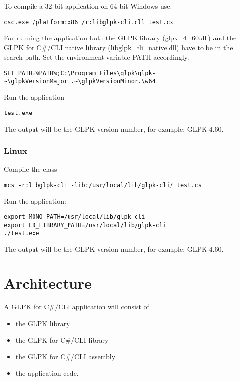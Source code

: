 \documentclass[a4paper,11pt]{report}
\newcommand{\glpkVersionMajor}{4}
\newcommand{\glpkVersionMinor}{60}
\begin{document}
To compile a 32 bit application on 64 bit Windows use:

\begin{lstlisting}
csc.exe /platform:x86 /r:libglpk-cli.dll test.cs
\end{lstlisting}

For running the application both the GLPK library
(glpk\_\glpkVersionMajor\_\glpkVersionMinor.dll) and the GLPK for C\#/CLI
native library (libglpk\_cli\_native.dll) have to be in the search path.
Set the environment variable PATH accordingly.

\begin{lstlisting}
SET PATH=%PATH%;C:\Program Files\glpk\glpk-~\glpkVersionMajor..~\glpkVersionMinor.\w64
\end{lstlisting}

Run the application

\begin{lstlisting}
test.exe
\end{lstlisting}

The output will be the GLPK version number, for example:
GLPK \glpkVersionMajor.\glpkVersionMinor.

\subsection{Linux}
Compile the class

\begin{lstlisting}
mcs -r:libglpk-cli -lib:/usr/local/lib/glpk-cli/ test.cs
\end{lstlisting}

Run the application:

\begin{lstlisting}
export MONO_PATH=/usr/local/lib/glpk-cli
export LD_LIBRARY_PATH=/usr/local/lib/glpk-cli
./test.exe
\end{lstlisting}

The output will be the GLPK version number, for example:
GLPK \glpkVersionMajor.\glpkVersionMinor.

\chapter{Architecture}
A GLPK for C\#/CLI application will consist of
\begin{itemize}
\item the GLPK library
\item the GLPK for C\#/CLI library
\item the GLPK for C\#/CLI assembly
\item the application code.
\end{itemize}
\end{document}
